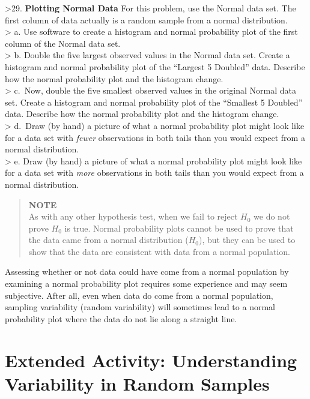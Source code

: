 \documentclass[
]{report}
\begin{document}
\textgreater29. \textbf{Plotting Normal Data} For this problem, use the Normal data set. The first column of data actually is a random sample from a normal distribution.\\
\textgreater{} a. Use software to create a histogram and normal probability plot of the first column of the Normal data set.\\
\textgreater{} b. Double the five largest observed values in the Normal data set. Create a histogram and normal probability plot of the ``Largest 5 Doubled'' data. Describe how the normal probability plot and the histogram change.\\
\textgreater{} c.~Now, double the five smallest observed values in the original Normal data set. Create a histogram and normal probability plot of the ``Smallest 5 Doubled'' data. Describe how the normal probability plot and the histogram change.\\
\textgreater{} d.~Draw (by hand) a picture of what a normal probability plot might look like for a data set with \emph{fewer} observations in both tails than you would expect from a normal distribution.\\
\textgreater{} e. Draw (by hand) a picture of what a normal probability plot might look like for a data set with \emph{more} observations in both tails than you would expect from a normal distribution.

\begin{quote}
\textbf{NOTE}\\
As with any other hypothesis test, when we fail to reject \(H_0\) we do not prove \(H_0\) is true. Normal probability plots cannot be used to prove that the data came from a normal distribution (\(H_0\)), but they can be used to show that the data are consistent with data from a normal population.
\end{quote}

Assessing whether or not data could have come from a normal population by examining a normal probability plot requires some experience and may seem subjective. After all, even when data do come from a normal population, sampling variability (random variability) will sometimes lead to a normal probability plot where the data do not lie along a straight line.

\section*{Extended Activity: Understanding Variability in Random Samples}\label{extended-activity-understanding-variability-in-random-samples}
\end{document}
